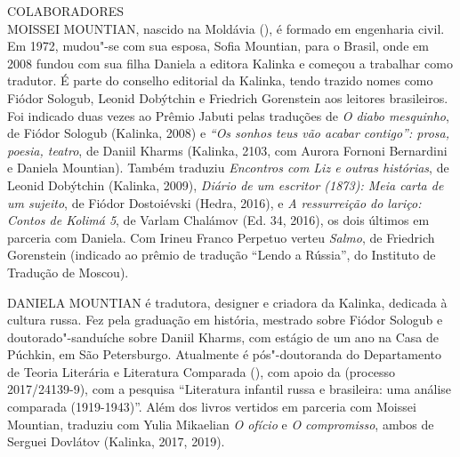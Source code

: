 \clearpage
\thispagestyle{empty}

\movetoevenpage
\small\MyriadPro
\label{colaboradores}

\noindent{}COLABORADORES\\

\noindent{}MOISSEI MOUNTIAN, nascido na Moldávia (\scalebox{.8}{URSS}), é formado em engenharia civil. Em 1972, mudou"-se com sua esposa, Sofia Mountian, para o Brasil,
onde em 2008 fundou com sua filha Daniela a editora Kalinka e começou a
trabalhar como tradutor. É parte do conselho editorial da Kalinka, tendo
trazido nomes como Fiódor Sologub, Leonid Dobýtchin e Friedrich
Gorenstein aos leitores brasileiros. Foi indicado duas vezes ao Prêmio
Jabuti pelas traduções de \emph{O diabo mesquinho}, de Fiódor Sologub
(Kalinka, 2008) e \emph{``Os sonhos teus vão acabar contigo'': prosa,
poesia, teatro}, de Daniil Kharms (Kalinka, 2103, com Aurora Fornoni
Bernardini e Daniela Mountian). Também traduziu \emph{Encontros com Liz
e outras histórias}, de Leonid Dobýtchin (Kalinka, 2009), \emph{Diário
de um escritor (1873): Meia carta de um sujeito}, de Fiódor Dostoiévski
(Hedra, 2016), e \emph{A ressurreição do lariço: Contos de Kolimá 5}, de
Varlam Chalámov (Ed. 34, 2016), os dois últimos em parceria com Daniela.
Com Irineu Franco Perpetuo verteu \emph{Salmo}, de Friedrich Gorenstein
(indicado ao prêmio de tradução ``Lendo a Rússia'', do Instituto de
Tradução de Moscou).

\medskip

\noindent{}DANIELA MOUNTIAN é tradutora, designer e criadora da Kalinka, de­dicada
à cultura russa. Fez pela \scalebox{0.8}{USP} graduação em história, mestrado sobre
Fiódor Sologub e doutorado"-sanduíche sobre Daniil Kharms, com estágio de
um ano na Casa de Púchkin, em São Petersburgo. Atualmente é
pós"-doutoranda do Departamento de Teoria Literária e Literatura
Comparada (\scalebox{0.8}{USP}), com apoio da \scalebox{0.8}{FAPESP} (processo 2017/24139-9), com a pesquisa ``Literatura infantil
russa e brasileira: uma análise comparada (1919-1943)''. Além dos livros
vertidos em parceria com Moissei Mountian, traduziu com Yulia Mikaelian
\emph{O ofício} e \emph{O compromisso}, ambos de Serguei Dovlátov
(Kalinka, 2017, 2019).


\medskip


